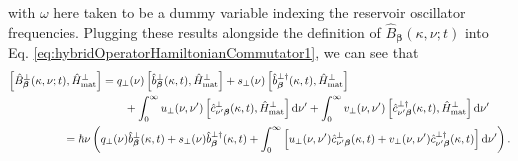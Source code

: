 \documentclass{article}
\begin{document}
with $\omega$ here taken to be a dummy variable indexing the reservoir oscillator frequencies. Plugging these results alongside the definition of $\hat{B}_{\bm{\beta}}(\kappa,\nu;t)$ into Eq. \eqref{eq:hybridOperatorHamiltonianCommutator1}, we can see that
\begin{equation}
\begin{split}
\left[\hat{B}_{\bm{\beta}}^\perp(\kappa,\nu;t),\hat{H}_\mathrm{mat}^\perp\right] &= q_\perp(\nu)\left[\hat{b}_{\bm{\beta}}^\perp(\kappa,t),\hat{H}_\mathrm{mat}^\perp\right] + s_\perp(\nu)\left[\hat{b}_{\bm{\beta}}^{\perp\dagger}(\kappa,t),\hat{H}_\mathrm{mat}^\perp\right]\\
&\qquad + \int_0^\infty u_\perp(\nu,\nu')\left[\hat{c}_{\nu'\bm{\beta}}^\perp(\kappa,t),\hat{H}_\mathrm{mat}^\perp\right]\mathrm{d}\nu' + \int_0^\infty v_\perp(\nu,\nu')\left[\hat{c}_{\nu'\bm{\beta}}^{\perp\dagger}(\kappa,t),\hat{H}_\mathrm{mat}^\perp\right]\mathrm{d}\nu'\\
&\hspace{-0.1\textwidth}= \hbar\nu\left(q_\perp(\nu)\hat{b}_{\bm{\beta}}^\perp(\kappa,t) + s_\perp(\nu)\hat{b}_{\bm{\beta}}^{\perp\dagger}(\kappa,t) + \int_0^\infty\left[u_\perp(\nu,\nu')\hat{c}_{\nu'\bm{\beta}}^\perp(\kappa,t) + v_\perp(\nu,\nu')\hat{c}_{\nu'\bm{\beta}}^{\perp\dagger}(\kappa,t)\right]\mathrm{d}\nu'\right).
\end{split}
\end{equation}
\end{document}
